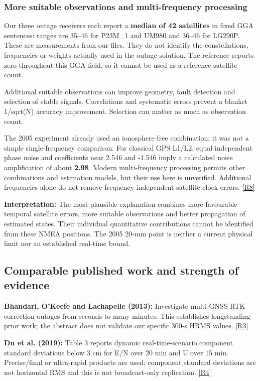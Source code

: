 \documentclass[11pt,a4paper]{article}
\numberwithin{equation}{section}
\numberwithin{figure}{section}
\begin{document}
\subsubsection{More suitable observations and multi-frequency processing}

Our three outage receivers each report a \textbf{median of 42 satellites} in fixed GGA sentences: ranges are 35–46 for P23M\_1 and UM980 and 36–46 for LG290P. These are measurements from our files. They do not identify the constellations, frequencies or weights actually used in the outage solution. The reference reports zero throughout this GGA field, so it cannot be used as a reference satellite count.

Additional suitable observations can improve geometry, fault detection and selection of stable signals. Correlations and systematic errors prevent a blanket 1/\allowbreak{}sqrt(N) accuracy improvement. Selection can matter as much as observation count.

The 2005 experiment already used an ionosphere-free combination; it was not a simple single-frequency comparison. For classical GPS L1/\allowbreak{}L2, equal independent phase noise and coefficients near 2.546 and -1.546 imply a calculated noise amplification of about \textbf{2.98}. Modern multi-frequency processing permits other combinations and estimation models, but their use here is unverified. Additional frequencies alone do not remove frequency-independent satellite clock errors. \hyperlink{ref-R8}{[R8]}

\textbf{Interpretation:} The most plausible explanation combines more favourable temporal satellite errors, more suitable observations and better propagation of estimated states. Their individual quantitative contributions cannot be identified from these NMEA positions. The 2005 20-mm point is neither a current physical limit nor an established real-time bound.

\subsection{Comparable published work and strength of evidence}

\textbf{Bhandari, O’Keefe and Lachapelle (2013):} Investigate multi-GNSS RTK correction outages from seconds to many minutes. This establishes longstanding prior work; the abstract does not validate our specific 300-s HRMS values. \hyperlink{ref-R3}{[R3]}

\textbf{Du et al. (2019):} Table 3 reports dynamic real-time-scenario component standard deviations below 3 cm for E/\allowbreak{}N over 20 min and U over 15 min. Precise/\allowbreak{}final or ultra-rapid products are used; component standard deviations are not horizontal RMS and this is not broadcast-only replication. \hyperlink{ref-R4}{[R4]}
\end{document}
